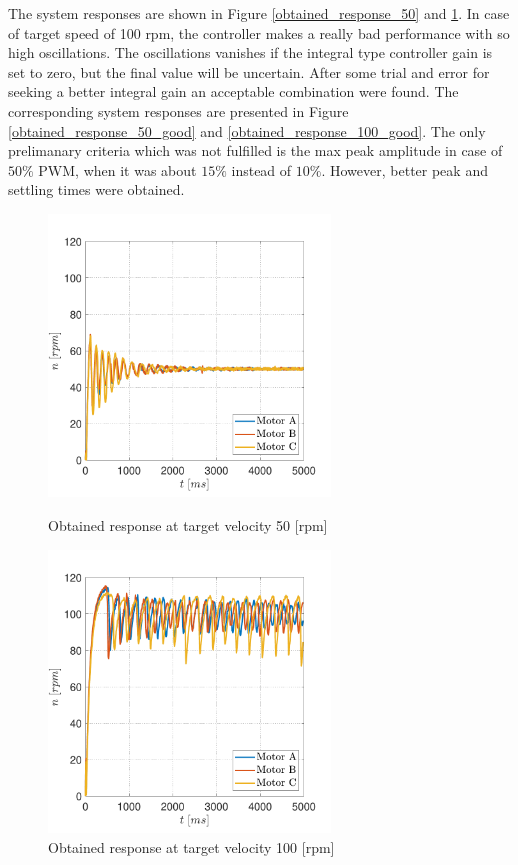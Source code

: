 \documentclass[12pt,english,twoside]{article}
\begin{document}
The system responses are shown in Figure \ref{obtained_response_50} and \ref{obtained_response_100}. In case of target speed of 100 rpm, the controller makes a really bad performance with so high oscillations. The oscillations vanishes if the integral type controller gain is set to zero, but the final value will be uncertain. After some trial and error for seeking a better integral gain an acceptable combination were found. The corresponding system responses are presented in Figure  \ref{obtained_response_50_good} and \ref{obtained_response_100_good}. The only prelimanary criteria which was not fulfilled is the max peak amplitude in case of $50\%$ PWM, when it was about $15\%$ instead of $10\%$. However, better peak and settling times were obtained.
\newpage
\begin{figure}[htb!]
	\centering
	\centering
	\includegraphics[height=7.5cm]{figures/controlled_50_p_02_i_11}
	\caption{Obtained response at target velocity 50 [rpm]}
	\label{obtained_response_50}
	\endminipage\hfill
	\centering
	\includegraphics[height=7.5cm]{figures/controlled_100_p_02_i_11}
	\caption{Obtained response at target velocity 100 [rpm]}
	\label{obtained_response_100}
	\endminipage\hfill
\end{figure}
\end{document}
